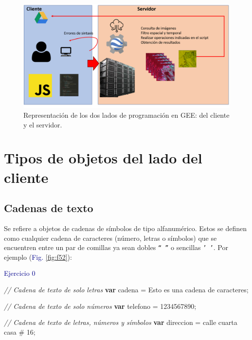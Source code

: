 \documentclass[
  12pt,
  letterpaper,
  twoside]{book}
\newenvironment{Shaded}{\begin{snugshade}}{\end{snugshade}}
\newcommand{\CommentTok}[1]{\textcolor[rgb]{0.24,0.58,0.00}{\textit{#1}}}
\newcommand{\ControlFlowTok}[1]{\textcolor[rgb]{0.00,0.00,0.00}{\textbf{#1}}}
\newcommand{\NormalTok}[1]{#1}
\newcommand{\OperatorTok}[1]{\textcolor[rgb]{0.00,0.00,0.00}{#1}}
\newcommand{\StringTok}[1]{\textcolor[rgb]{0.87,0.29,0.22}{#1}}
\begin{document}
\begin{figure}[H]

{\centering \includegraphics[width=0.95\linewidth]{Img/daigFunc} 

}

\caption{Representación de los dos lados de programación en GEE: del cliente y el servidor.}\label{fig:f51}
\end{figure}

\hypertarget{tipos-de-objetos-del-lado-del-cliente}{%
\section{Tipos de objetos del lado del cliente}\label{tipos-de-objetos-del-lado-del-cliente}}

\hypertarget{cadenas-de-texto}{%
\subsection*{Cadenas de texto}\label{cadenas-de-texto}}

Se refiere a objetos de cadenas de símbolos de tipo alfanumérico. Estos se definen como cualquier cadena de caracteres (número, letras o símbolos) que se encuentren entre un par de comillas ya sean dobles \texttt{“\ ”} o sencillas \texttt{’\ ’}. Por ejemplo (\textcolor{darkblue}{Fig.} \ref{fig:f52}):

\textcolor{darkblue}{Ejercicio 0}

\begin{Shaded}
\begin{Highlighting}[]
\CommentTok{// Cadena de texto de solo letras}
\ControlFlowTok{var}\NormalTok{ cadena }\OperatorTok{=} \StringTok{\textquotesingle{}Esto es una cadena de caracteres\textquotesingle{}}\OperatorTok{;}

\CommentTok{// Cadena de texto de solo números}
\ControlFlowTok{var}\NormalTok{ telefono }\OperatorTok{=} \StringTok{\textquotesingle{}1234567890\textquotesingle{}}\OperatorTok{;}  
                     
\CommentTok{// Cadena de texto de letras, números y símbolos}
\ControlFlowTok{var}\NormalTok{ direccion }\OperatorTok{=} \StringTok{\textquotesingle{}calle cuarta casa \# 16\textquotesingle{}}\OperatorTok{;}
\end{Highlighting}
\end{Shaded}
\end{document}
